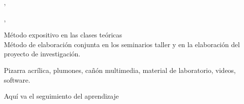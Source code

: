 \documentclass[a4paper,8pt]{article}
\begin{document}
\begin{contenidos}
\cite{brusilovsky98}, \cite{elmasri04} 


\nextUnidad{\IMDistributedDatabases}
\nextCapitulo{\IMDistributedDatabases}
\nextTema{\IMDistributedDatabasesTopicDistributed}
\nextTema{\IMDistributedDatabasesTopicParallel}

\cite{ozsu99}, \cite{date04} 





\end{contenidos}




\begin{estrategiasEnsenanza}
    \begin{metodos}
        Método expositivo en las clases teóricas \\
        Método de elaboración conjunta en los seminarios taller y en la elaboración del proyecto de investigación.
    \end{metodos}
    \begin{medios}
        Pizarra acrílica, plumones, cañón multimedia, material de laboratorio, videos, software.
    \end{medios}
    \begin{formasOrganizacion}
    \end{formasOrganizacion}
    \begin{programacion}
    \end{programacion}
    \begin{segumientoAprendizaje}
        Aquí va el seguimiento del aprendizaje
    \end{segumientoAprendizaje}
\end{estrategiasEnsenanza}
\end{document}
